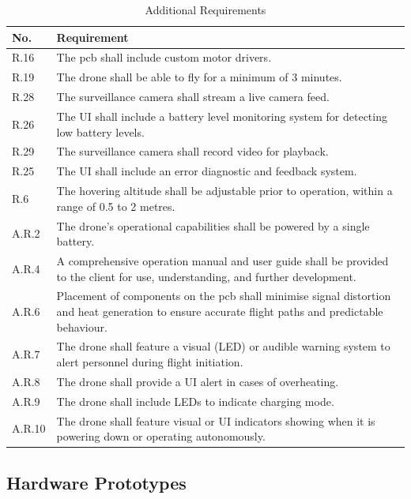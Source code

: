 \begin{table}[H]
\centering
\caption{Additional Requirements}
\begin{tabular}{|>{\centering\arraybackslash}p{} | p{}|}
\hline
\rowcolor{gray!15}
\textbf{No.} & \textbf{Requirement} \\
\hline
R.16 & The \gls{pcb} shall include custom motor drivers. \\
\hline
R.19 & The drone shall be able to fly for a minimum of 3 minutes. \\
\hline
R.28 & The surveillance camera shall stream a live camera feed. \\
\hline
R.26 & The UI shall include a battery level monitoring system for detecting low battery levels. \\
\hline
R.29 & The surveillance camera shall record video for playback. \\
\hline
R.25 & The UI shall include an error diagnostic and feedback system. \\
\hline
R.6  & The hovering altitude shall be adjustable prior to operation, within a range of 0.5 to 2 metres. \\
\hline
A.R.2 & The drone’s operational capabilities shall be powered by a single battery. \\
\hline
A.R.4 & A comprehensive operation manual and user guide shall be provided to the client for use, understanding, and further development. \\
\hline
A.R.6 & Placement of components on the \gls{pcb} shall minimise signal distortion and heat generation to ensure accurate flight paths and predictable behaviour. \\
\hline
A.R.7 & The drone shall feature a visual (LED) or audible warning system to alert personnel during flight initiation. \\
\hline
A.R.8 & The drone shall provide a UI alert in cases of overheating. \\
\hline
A.R.9 & The drone shall include LEDs to indicate charging mode. \\
\hline
A.R.10 & The drone shall feature visual or UI indicators showing when it is powering down or operating autonomously. \\
\hline
\end{tabular}
\end{table}

\pagebreak
\subsection{Hardware Prototypes}
\label{app:pcb-prototypes}

